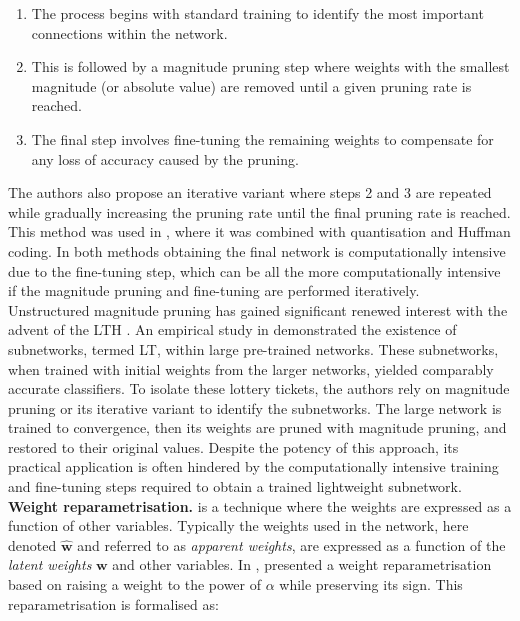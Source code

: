 \begin{enumerate}
  \item The process begins with standard training to identify the most important
  connections within the network.
  \item This is followed by a magnitude pruning step where weights with the
  smallest magnitude (or absolute value) are removed until a given pruning rate
  is reached.
  \item The final step involves fine-tuning the remaining weights to compensate
  for any loss of accuracy caused by the pruning.\\
\end{enumerate}

The authors also propose an iterative variant where steps 2 and 3 are
repeated while gradually increasing the pruning rate until the final pruning
rate is reached. This method was used in \cite{DBLP:journals/corr/HanMD15},
where it was combined with quantisation and Huffman coding. In both methods
\cite{DBLP:conf/nips/HanPTD15,DBLP:journals/corr/HanMD15} obtaining the final
network is computationally intensive due to the fine-tuning step, which can be
all the more computationally intensive if the magnitude pruning and fine-tuning
are performed iteratively. \\


Unstructured magnitude pruning has gained significant renewed interest with the
advent of the \acf{LTH} \cite{DBLP:conf/iclr/FrankleC19}. An empirical study in
\cite{DBLP:conf/iclr/FrankleC19} demonstrated the existence of subnetworks,
termed \acf{LT}, within large pre-trained networks. These subnetworks, when
trained with initial weights from the larger networks, yielded comparably
accurate classifiers. To isolate these lottery tickets, the authors rely on
magnitude pruning or its iterative variant to identify the subnetworks. The
large network is trained to convergence, then its weights are pruned with
magnitude pruning, and restored to their original values. Despite the potency of
this approach, its practical application is often hindered by the
computationally intensive training and fine-tuning steps required to obtain a
trained lightweight subnetwork.\\


\noindent \textbf{Weight reparametrisation.} \DIFdelbegin {}\DIFdelend \DIFaddbegin {}\DIFaddend is a
technique where the weights are expressed as a function of other variables.
Typically the weights used in the network, here denoted $\mathbf{\hat{w}}$ and
referred to as \emph{apparent weights}, are expressed as a function of the
\emph{latent weights} $\mathbf{w}$ and other variables. In \cite{powerprop},
\citeauthor{powerprop} presented a weight reparametrisation based on raising a
weight to the power of $\alpha$ while preserving its sign. This
reparametrisation is formalised as: \\

